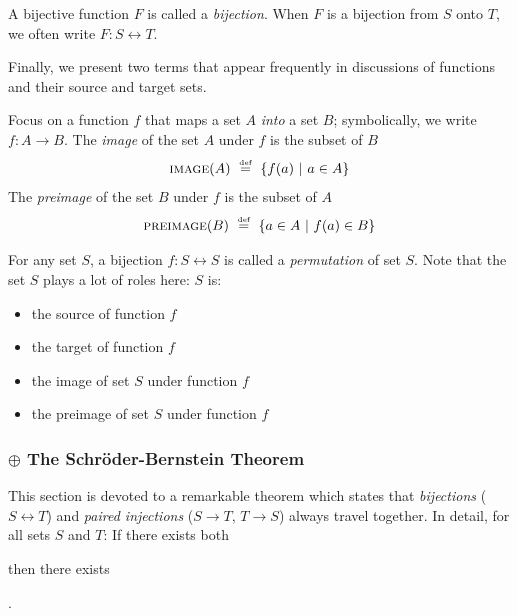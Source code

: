 \begin{enumerate}
A bijective function $F$ is called a {\it bijection}.  When $F$ is a bijection from $S$ onto $T$, we often write $F: S \leftrightarrow T$.
\end{enumerate}

\medskip

Finally, we present two terms that appear frequently in discussions of functions and their source and target sets.

\smallskip

 
Focus on a function $f$ that maps a set $A$ {\em into} a set $B$; symbolically, we write $f: A \rightarrow B$.  The {\it image} of the set $A$ under $f$ is the subset of $B$
\[  \mbox{\sc image}(A) \ \stackrel{\mbox{{\tiny def}}}{=} \  \{f(a) \ | \ a \in A\} \]
The {\it preimage} of the set $B$ under $f$ is the subset of $A$
\[  \mbox{\sc preimage}(B) \ \stackrel{\mbox{{\tiny def}}}{=} \  \{a \in A \ | \ f(a) \in B\} \]


\smallskip

 

\noindent
For any set $S$, a bijection $f: S \leftrightarrow S$ is called a {\it permutation} of set $S$.   Note that the set $S$ plays a lot of roles here: $S$ is:
\begin{itemize}
\item
the source of function $f$
\item
the target of function $f$
\item
the image of set $S$ under function $f$
\item
the preimage of set $S$ under function $f$
\end{itemize}


\subsubsection{$\oplus$ The Schr\"{o}der-Bernstein Theorem}
\label{sec:schroeder-bernstein}

This section is devoted to a remarkable theorem which states that {\em bijections} ($S \leftrightarrow T$) and {\em paired injections} ($S \rightarrow T$, $T \rightarrow S$) always travel together.  In detail, for all sets $S$ and $T$: If there exists both

\hspace*{.2in}{\em an injection from $S$ to $T$ and an injection from $T$ to $S$}

\noindent then there exists

\hspace*{.2in}{\em a bijection between $S$ and $T$}.

